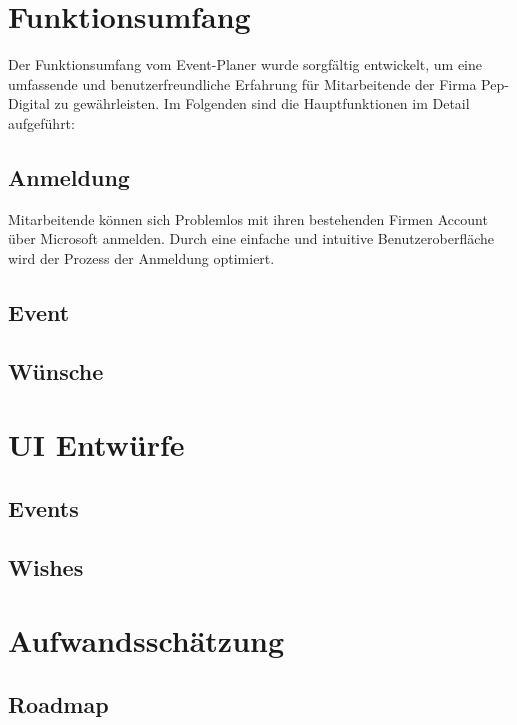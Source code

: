 \documentclass[a4paper,12pt]{article}
\begin{document}
\section{Funktionsumfang}
Der Funktionsumfang vom Event-Planer wurde sorgfältig entwickelt, um eine umfassende und benutzerfreundliche Erfahrung für Mitarbeitende der Firma Pep-Digital zu gewährleisten. Im Folgenden sind die Hauptfunktionen im Detail aufgeführt:
\subsection{Anmeldung}
Mitarbeitende können sich Problemlos mit ihren bestehenden Firmen Account über Microsoft anmelden. Durch eine einfache und intuitive Benutzeroberfläche wird der Prozess der Anmeldung optimiert.
\subsection{Event}
\subsection{Wünsche}
\newpage
\section{UI Entwürfe}
\subsection{Events}
\subsection{Wishes}
\newpage
\section{Aufwandsschätzung}
\subsection{Roadmap}
\newpage
\end{document}
